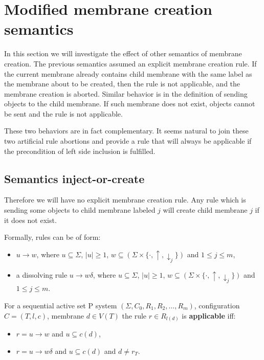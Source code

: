 \documentclass[llncs,submission,copyright,creativecommons]{../lib/lncs/llncs}
\begin{document}



\section{Modified membrane creation semantics} %
\label{sec:modified_membrane_creation_semantics}

In this section we will investigate the effect of other semantics of membrane creation. The previous semantics assumed an explicit membrane creation rule. If the current membrane already contains child membrane with the same label as the membrane about to be created, then the rule is not applicable, and the membrane creation is aborted. Similar behavior is in the definition of sending objects to the child membrane. If such membrane does not exist, objects cannot be sent and the rule is not applicable.

These two behaviors are in fact complementary. It seems natural to join these two artificial rule abortions and provide a rule that will always be applicable if the precondition of left side inclusion is fulfilled.

\subsection{Semantics inject-or-create} %
\label{sub:semantics_inject_or_create}

Therefore we will have no explicit membrane creation rule. Any rule which is sending some objects to child membrane labeled $j$ will create child membrane $j$ if it does not exist.

Formally, rules can be of form:
\begin{itemize}
  \item $u\rightarrow w$, where $u\subseteq \Sigma$, $|u|\geq 1$, $w\subseteq (\Sigma\times\{\cdot, \uparrow, \downarrow_j\})$ and $1\leq j\leq m$,
  \item a dissolving rule $u\rightarrow w\delta$, where $u\subseteq \Sigma$, $|u|\geq 1$, $w\subseteq (\Sigma\times\{\cdot, \uparrow, \downarrow_j\})$ and $1\leq j\leq m$.
\end{itemize}

For a sequential active set P system $(\Sigma, C_0, R_1, R_2, \dots , R_m)$, configuration $C = (T, l, c)$, membrane $d\in V(T)$ the rule $r\in R_{l(d)}$ is {\bf applicable} iff:
\begin{itemize}
  \item $r = u\rightarrow w$ and $u\subseteq c(d)$,
  \item $r = u\rightarrow w\delta$ and $u\subseteq c(d)$ and $d\neq r_T$.
\end{itemize}
\end{document}
